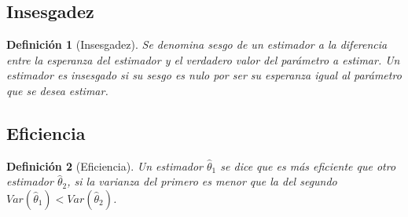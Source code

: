 \documentclass[a4paper, 10pt]{article} %
\newtheorem{definition}{Definición}[section]
\begin{document}
\subsection{Insesgadez}
\begin{definition}[Insesgadez]
Se denomina sesgo de un estimador a la diferencia entre la esperanza del estimador y el verdadero valor del parámetro a estimar. Un estimador es insesgado si su sesgo es nulo por ser su esperanza igual al parámetro que se desea estimar.
\end{definition}


\subsection{Eficiencia}
\begin{definition}[Eficiencia]
Un estimador $\hat{\theta}_1$ se dice que es más eficiente que otro estimador $\hat{\theta}_2$, si la varianza del primero es menor que la del segundo $Var(\hat{\theta}_1)<Var(\hat{\theta}_2)$.
\end{definition}

%
\end{document}
